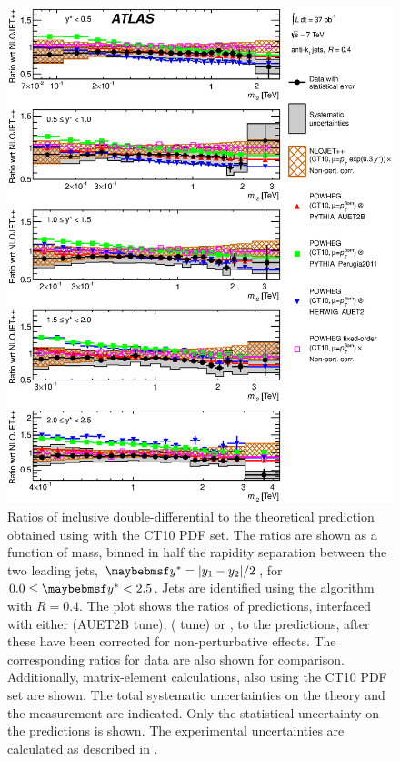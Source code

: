 \begin{figure}
  \includegraphics[width=\largefigwidth]{chapters/dijets/DijetMassYStarRatioFinal04_central.eps}
  \caption{Ratios of inclusive \dijet double-differential \xs to the theoretical
     prediction obtained using \NLOjetpp with the CT10 PDF set. The ratios
     are shown as a function of \dijet mass, binned in half the rapidity separation
     between the two leading jets, $\yStar = |y_1 - y_2|/2$, for $0.0 \leq \yStar < 2.5$.
     Jets are identified using the \akt algorithm with $R=0.4$. The plot shows the
     ratios of \Powheg predictions, interfaced with either \Pythia (AUET2B tune), \Pythia
     ( tune) or \Herwig, to the \NLOjetpp predictions, after these have
     been corrected for non-perturbative effects. The corresponding ratios for data
     are also shown for comparison. Additionally, \Powheg matrix-element calculations,
     also using the CT10 PDF set are shown. The total systematic uncertainties on
     the theory and the measurement are indicated. Only the statistical uncertainty
     on the \Powheg predictions is shown. The experimental uncertainties are calculated
     as described in .}
  \label{fig:dijets:PowhegRatio_akt4_central}
\end{figure}

